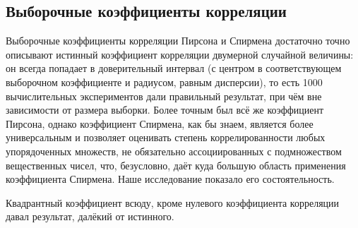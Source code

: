 \subsection{Выборочные коэффициенты корреляции}

Выборочные коэффициенты корреляции Пирсона и Спирмена достаточно точно описывают истинный коэффициент корреляции двумерной случайной величины: он всегда попадает в доверительный интервал (с центром в соответствующем выборочном коэффициенте и радиусом, равным дисперсии), то есть 1000 вычислительных экспериментов дали правильный результат, при чём вне зависимости от размера выборки. Более точным был всё же коэффициент Пирсона, однако коэффициент Спирмена, как бы знаем, является более универсальным и позволяет оценивать степень коррелированности любых упорядоченных множеств, не обязательно ассоциированных с подмножеством вещественных чисел, что, безусловно, даёт куда большую область применения коэффициента Спирмена. Наше исследование показало его состоятельность.

Квадрантный коэффициент всюду, кроме нулевого коэффициента корреляции давал результат, далёкий от истинного.